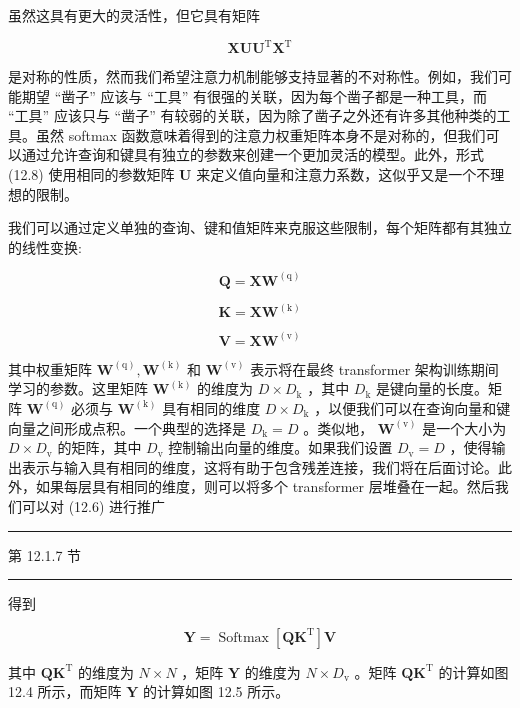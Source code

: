 \documentclass[10pt]{article}
\newcommand{\HRule}{\begin{center}\rule{0.9\linewidth}{0.2mm}\end{center}}
\begin{document}
虽然这具有更大的灵活性，但它具有矩阵

\[
\mathbf{{XU}}{\mathbf{U}}^{\mathrm{T}}{\mathbf{X}}^{\mathrm{T}} \tag{12.9}
\]

是对称的性质，然而我们希望注意力机制能够支持显著的不对称性。例如，我们可能期望 “凿子” 应该与 “工具” 有很强的关联，因为每个凿子都是一种工具，而 “工具” 应该只与 “凿子” 有较弱的关联，因为除了凿子之外还有许多其他种类的工具。虽然 softmax 函数意味着得到的注意力权重矩阵本身不是对称的，但我们可以通过允许查询和键具有独立的参数来创建一个更加灵活的模型。此外，形式 (12.8) 使用相同的参数矩阵 \(\mathbf{U}\) 来定义值向量和注意力系数，这似乎又是一个不理想的限制。

我们可以通过定义单独的查询、键和值矩阵来克服这些限制，每个矩阵都有其独立的线性变换:

\[
\mathbf{Q} = {\mathbf{{XW}}}^{\left( \mathrm{q}\right) } \tag{12.10}
\]

\[
\mathbf{K} = \mathbf{X}{\mathbf{W}}^{\left( \mathrm{k}\right) } \tag{12.11}
\]

\[
\mathbf{V} = \mathbf{X}{\mathbf{W}}^{\left( \mathrm{v}\right) } \tag{12.12}
\]

其中权重矩阵 \({\mathbf{W}}^{\left( \mathrm{q}\right) },{\mathbf{W}}^{\left( \mathrm{k}\right) }\) 和 \({\mathbf{W}}^{\left( \mathrm{v}\right) }\) 表示将在最终 transformer 架构训练期间学习的参数。这里矩阵 \({\mathbf{W}}^{\left( \mathrm{k}\right) }\) 的维度为 \(D \times  {D}_{\mathrm{k}}\) ，其中 \({D}_{\mathrm{k}}\) 是键向量的长度。矩阵 \({\mathbf{W}}^{\left( \mathrm{q}\right) }\) 必须与 \({\mathbf{W}}^{\left( \mathrm{k}\right) }\) 具有相同的维度 \(D \times  {D}_{\mathrm{k}}\) ，以便我们可以在查询向量和键向量之间形成点积。一个典型的选择是 \({D}_{\mathrm{k}} = D\) 。类似地， \({\mathbf{W}}^{\left( \mathrm{v}\right) }\) 是一个大小为 \(D \times  {D}_{\mathrm{v}}\) 的矩阵，其中 \({D}_{\mathrm{v}}\) 控制输出向量的维度。如果我们设置 \({D}_{\mathrm{v}} = D\) ，使得输出表示与输入具有相同的维度，这将有助于包含残差连接，我们将在后面讨论。此外，如果每层具有相同的维度，则可以将多个 transformer 层堆叠在一起。然后我们可以对 (12.6) 进行推广

\HRule

第 12.1.7 节

\HRule

得到

\[
\mathbf{Y} = \operatorname{Softmax}\left\lbrack  {\mathbf{{QK}}}^{\mathrm{T}}\right\rbrack  \mathbf{V} \tag{12.13}
\]

其中 \(\mathbf{Q}{\mathbf{K}}^{\mathrm{T}}\) 的维度为 \(N \times  N\) ，矩阵 \(\mathbf{Y}\) 的维度为 \(N \times  {D}_{\mathrm{v}}\) 。矩阵 \(\mathbf{Q}{\mathbf{K}}^{\mathrm{T}}\) 的计算如图 12.4 所示，而矩阵 \(\mathbf{Y}\) 的计算如图 12.5 所示。
\end{document}
